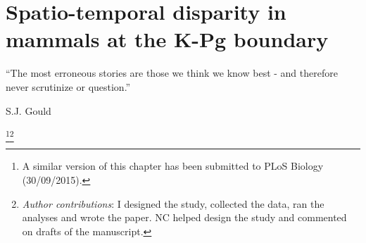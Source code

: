 

%
%

\chapter[Spatio-temporal disparity in mammals at the K-Pg boundary]{Spatio-temporal disparity in mammals at the K-Pg boundary}
\label{chap:STD_paper}

\bigskip
\begin{center}

\begin{quoteshrink}
  ``The most erroneous stories are those we think we know best - and therefore never scrutinize or question.''

\hfill{S.J. Gould}

\end{quoteshrink}
\bigskip

\footnote{A similar version of this chapter has been submitted to PLoS Biology (30/09/2015).}\footnote{\textit{Author contributions}: I designed the study, collected the data, ran the analyses and wrote the paper. NC helped design the study and commented on drafts of the manuscript.} \\

\end{center}
%
%
